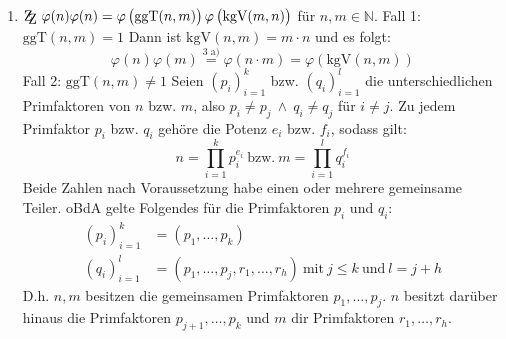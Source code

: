 \documentclass[DIN, pagenumber=false, fontsize=11pt, parskip=half]{scrartcl}
\newcommand{\N}[0]{\mathbb{N}}
\newcommand{\ZZ}{\mathrm{Z\kern-.3em\raise-0.5ex\hbox{Z}}}
\newcommand{\ggt}{\text{ggT}}
\newcommand{\kgv}{\text{kgV}}
\begin{document}
\begin{enumerate}[label=\alph*)]
        \newpage

        \item $\ZZ \ \varphi(n) \varphi(n) = \varphi\left(\ggt(n, m)\right) \varphi\left(\kgv(m, n)\right)$ für $n, m \in \N$. \newline
        Fall 1: $\ggt(n, m) = 1$ \newline
        Dann ist $\kgv(n, m) = m \cdot n$ und es folgt:
        \begin{equation*}
            \varphi(n) \varphi(m) \stackrel{\text{3 a)}}{=} \varphi(n \cdot m) = \varphi\left(\kgv(n, m)\right)
        \end{equation*}
        Fall 2: $\ggt(n, m) \neq 1$ \newline
        Seien $(p_i)_{i=1}^k$ bzw. $(q_i)_{i=1}^l$ die unterschiedlichen Primfaktoren von $n$ bzw. $m$, also $p_i \neq p_j \ \wedge \ q_i \neq q_j$ für 
        $i \neq j$. Zu jedem Primfaktor $p_i$ bzw. $q_i$ gehöre die Potenz $e_i$ bzw. $f_i$, sodass gilt:
        \begin{equation}
            n = \prod_{i=1}^k{p_i^{e_i}} \ \text{bzw.} \ m = \prod_{i=1}^l{q_i^{f_i}} \label{eq:pfz}
        \end{equation}
        Beide Zahlen nach Voraussetzung habe einen oder mehrere gemeinsame Teiler. oBdA gelte Folgendes für die Primfaktoren $p_i$ und $q_i$:
        \begin{align}
            (p_i)_{i=1}^k &= (p_1, \dots, p_k) \label{eq:nPrime}\\
            (q_i)_{i=1}^l &= (p_1, \dots, p_j, r_1, \dots, r_h) \ \text{mit} \ j \leq k \ \text{und} \ l = j+h \label{eq:mPrime}
        \end{align}
        D.h. $n, m$ besitzen die gemeinsamen Primfaktoren $p_1, \dots, p_j$. $n$ besitzt darüber hinaus die Primfaktoren $ p_{j+1}, \dots, p_k$ und $m$
        dir Primfaktoren $r_1, \dots, r_h$.

\end{enumerate}
\end{document}
